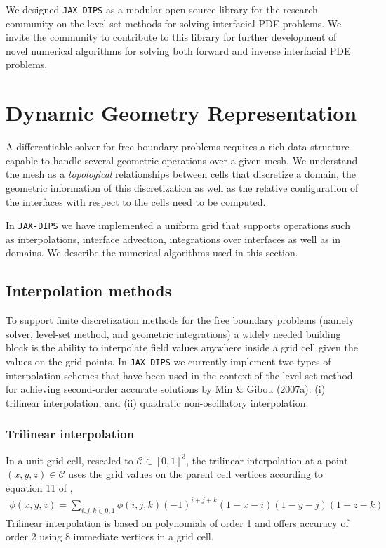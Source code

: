 \documentclass{elsarticle}
\begin{document}
We designed \texttt{JAX-DIPS} as a modular open source library for the research community on the level-set methods for solving interfacial PDE problems. We invite the community to contribute to this library for further development of novel numerical algorithms for solving both forward and inverse interfacial PDE problems.





\section{Dynamic Geometry Representation}
A differentiable solver for free boundary problems requires a rich data structure capable to handle several geometric operations over a given mesh. We understand the mesh as a \textit{topological} relationships between cells that discretize a domain, the geometric information of this discretization as well as the relative configuration of the interfaces with respect to the cells need to be computed. 

In \texttt{JAX-DIPS} we have implemented a uniform grid that supports operations such as interpolations, interface advection, integrations over interfaces as well as in domains. We describe the numerical algorithms used in this section.


\subsection{Interpolation methods}
To support finite discretization methods for the free boundary problems (namely solver, level-set method, and geometric integrations) a widely needed building block is the ability to interpolate field values anywhere inside a grid cell given the values on the grid points. In \texttt{JAX-DIPS} we currently implement two types of interpolation schemes that have been used in the context of the level set method for achieving second-order accurate solutions by Min \& Gibou (2007a)\cite{MIN2007300}: (i) trilinear interpolation, and (ii) quadratic non-oscillatory interpolation.


\subsubsection{Trilinear interpolation}
In a unit grid cell, rescaled to $\mathcal{C}\in [0,1]^3$, the trilinear interpolation at a point $(x,y,z)\in \mathcal{C}$ uses the grid values on the parent cell vertices according to equation 11 of \cite{MIN2007300},
\begin{align*}
 \phi(x,y,z)= \sum_{i,j,k\in {0,1}} \phi(i,j,k) (-1)^{i+j+k}(1-x-i)(1-y-j)(1-z-k)
\end{align*}
Trilinear interpolation is based on polynomials of order 1 and offers accuracy of order 2 using 8 immediate vertices in a grid cell.
\end{document}
